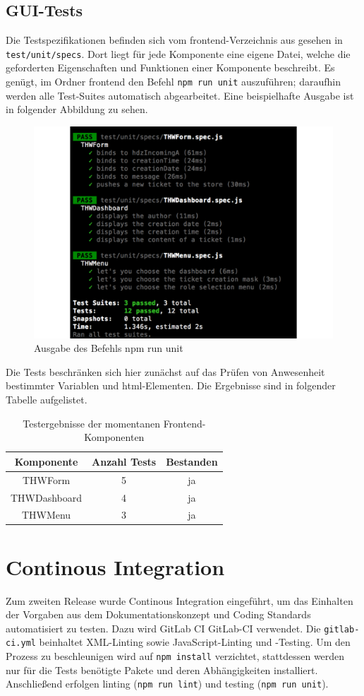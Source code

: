 \documentclass[a4paper,11pt,oneside, titlepage]{article}
\begin{document}
\subsection{GUI-Tests}
Die Testspezifikationen befinden sich vom frontend-Verzeichnis aus gesehen in \verb+test/unit/specs+.
Dort liegt für jede Komponente eine eigene Datei, welche die geforderten Eigenschaften und Funktionen
einer Komponente beschreibt. Es genügt, im Ordner frontend den Befehl \verb+npm run unit+ auszuführen; daraufhin werden alle Test-Suites automatisch abgearbeitet. Eine beispielhafte Ausgabe ist in folgender Abbildung zu sehen.
\begin{figure}[htpb]
\centering
\includegraphics[width=0.8\linewidth]{testsscreenshot}
\caption{Ausgabe des Befehls npm run unit}
\label{fig:npmtest}
\end{figure}
Die Tests beschränken sich hier zunächst auf das Prüfen von Anwesenheit bestimmter Variablen und html-Elementen.
Die Ergebnisse sind in folgender Tabelle aufgelistet.
\begin{table}[htpb]
\centering
\label{tab:test}
\begin{tabular}{c | c | c}
Komponente & Anzahl Tests & Bestanden \\
\hline
THWForm & 5 & ja \\
THWDashboard & 4 & ja \\
THWMenu & 3 & ja 
\end{tabular}
\caption{Testergebnisse der momentanen Frontend-Komponenten}
\end{table}
\section{Continous Integration}
\label{sub:continous integration}
Zum zweiten Release wurde Continous Integration eingeführt, um das Einhalten der Vorgaben aus dem Dokumentationskonzept und Coding Standards automatisiert zu testen. Dazu wird GitLab CI \gls{GitLab-CI} verwendet. Die \verb+gitlab-ci.yml+ beinhaltet XML-Linting sowie JavaScript-Linting und -Testing. Um den Prozess zu beschleunigen wird auf \verb|npm install| verzichtet, stattdessen werden nur für die Tests benötigte Pakete und deren Abhängigkeiten installiert. Anschließend erfolgen linting (\verb|npm run lint|) und testing (\verb|npm run unit|).

\newpage
\printglossaries
\end{document}
